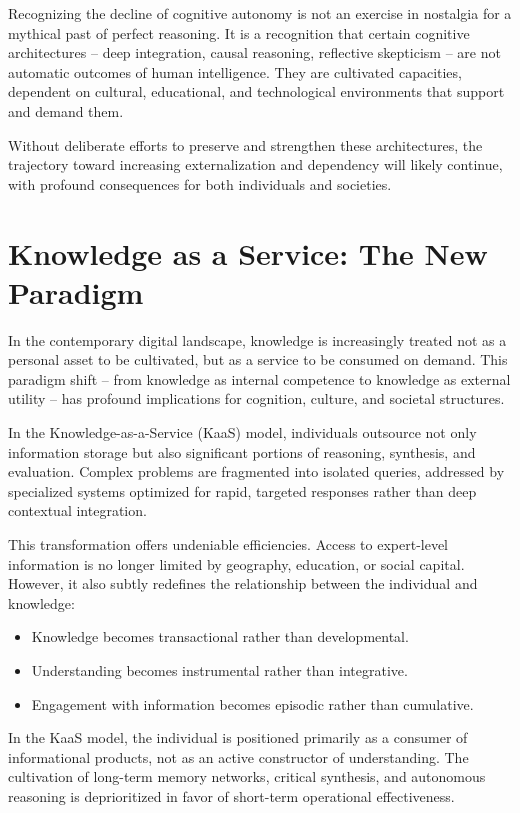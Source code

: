 Recognizing the decline of cognitive autonomy is not an exercise in
nostalgia for a mythical past of perfect reasoning. It is a recognition
that certain cognitive architectures -- deep integration, causal
reasoning, reflective skepticism -- are not automatic outcomes of human
intelligence. They are cultivated capacities, dependent on cultural,
educational, and technological environments that support and demand
them.

Without deliberate efforts to preserve and strengthen these
architectures, the trajectory toward increasing externalization and
dependency will likely continue, with profound consequences for both
individuals and societies.




\section{Knowledge as a Service: The New Paradigm}

In the contemporary digital landscape, knowledge is increasingly treated
not as a personal asset to be cultivated, but as a service to be
consumed on demand. This paradigm shift -- from knowledge as internal
competence to knowledge as external utility -- has profound implications
for cognition, culture, and societal structures.

In the Knowledge-as-a-Service (KaaS) model, individuals outsource not
only information storage but also significant portions of reasoning,
synthesis, and evaluation. Complex problems are fragmented into isolated
queries, addressed by specialized systems optimized for rapid, targeted
responses rather than deep contextual integration.

This transformation offers undeniable efficiencies. Access to
expert-level information is no longer limited by geography, education,
or social capital. However, it also subtly redefines the relationship
between the individual and knowledge:

\begin{itemize}
	\item Knowledge becomes transactional rather than developmental.
	\item Understanding becomes instrumental rather than integrative.
	\item Engagement with information becomes episodic rather than cumulative.
\end{itemize}

In the KaaS model, the individual is positioned primarily as a consumer
of informational products, not as an active constructor of
understanding. The cultivation of long-term memory networks, critical
synthesis, and autonomous reasoning is deprioritized in favor of
short-term operational effectiveness.

